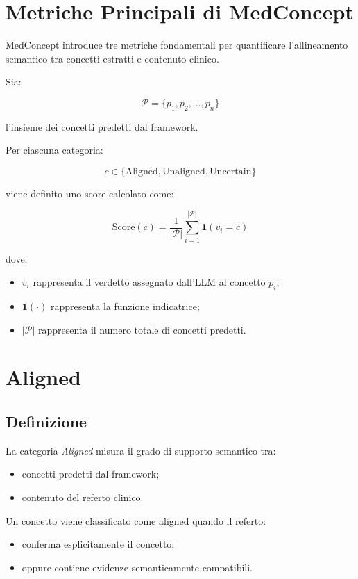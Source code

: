 \section{Metriche Principali di MedConcept}

MedConcept introduce tre metriche fondamentali per quantificare l'allineamento semantico tra concetti estratti e contenuto clinico.

Sia:

\[
\mathcal{P} = \{p_1, p_2, ..., p_n\}
\]

l'insieme dei concetti predetti dal framework.

Per ciascuna categoria:

\[
c \in \{\text{Aligned}, \text{Unaligned}, \text{Uncertain}\}
\]

viene definito uno score calcolato come:

\[
\text{Score}(c) = \frac{1}{|\mathcal{P}|}
\sum_{i=1}^{|\mathcal{P}|}
\mathbf{1}(v_i = c)
\]

dove:

\begin{itemize}
    \item $v_i$ rappresenta il verdetto assegnato dall'LLM al concetto $p_i$;
    \item $\mathbf{1}(\cdot)$ rappresenta la funzione indicatrice;
    \item $|\mathcal{P}|$ rappresenta il numero totale di concetti predetti.
\end{itemize}

\section{Aligned}

\subsection{Definizione}

La categoria \textit{Aligned} misura il grado di supporto semantico tra:

\begin{itemize}
    \item concetti predetti dal framework;
    \item contenuto del referto clinico.
\end{itemize}

Un concetto viene classificato come aligned quando il referto:

\begin{itemize}
    \item conferma esplicitamente il concetto;
    \item oppure contiene evidenze semanticamente compatibili.
\end{itemize}

